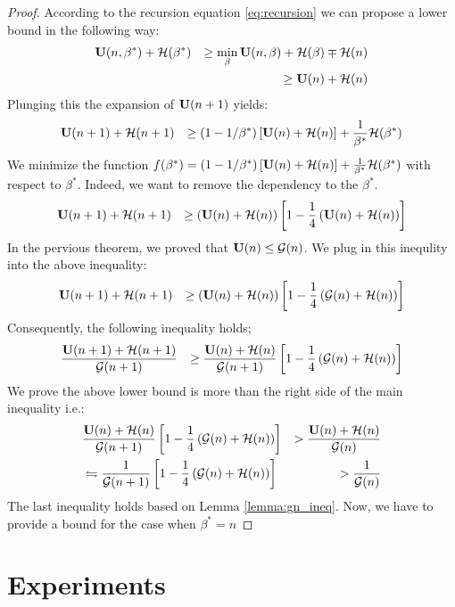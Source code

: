 \documentclass{article}
\begin{document}
\begin{proof}
According to the recursion equation \ref{eq:recursion} we can propose a lower
bound in the following way: 
\begin{eqnarray*}
	 & \mathbf U(n,\beta^*) + {\cal H}(\beta^*) & \geq \min_{\beta}
	 \mathbf U(n,\beta) + {\cal H}(\beta) \mp {\cal H}(n) \\ 
	 & & \geq \mathbf U(n) + {\cal H}(n)
\end{eqnarray*}
Plunging this the expansion of $\mathbf U(n+1)$ yields: 
\begin{eqnarray*}
	& \mathbf U(n+1) + {\cal H}(n+1) & \geq (1-1/\beta^*)\left[ \mathbf U(n) + {\cal H}(n)\right] +
	\frac{1}{\beta^*} {\cal H}(\beta^*) 
\end{eqnarray*}
We minimize the function $f(\beta^*) =  (1-1/\beta^*)\left[ \mathbf U(n) +
{\cal H}(n)\right] + \frac{1}{\beta^*} {\cal H}(\beta^*) $
with respect to $\beta^*$. Indeed, we want to remove the dependency to the
$\beta^*$.
\begin{eqnarray*}
	& \mathbf U(n+1) + {\cal H}(n+1) & \geq \left( \mathbf U(n) + {\cal H}(n)\right) \left[1 -
	\frac{1	}{4} \left( \mathbf U(n) + {\cal H}(n)\right)  \right]
\end{eqnarray*}
In the pervious theorem, we proved that $\mathbf U(n) \leq {\cal G}(n)$. We plug in
this inequlity into the above inequality: 
\begin{eqnarray*}
	& \mathbf U(n+1) + {\cal H}(n+1) & \geq \left( \mathbf U(n) + {\cal H}(n)\right) \left[1 -
	\frac{1	}{4} \left( {\cal G}(n) + {\cal H}(n)\right)  \right]
\end{eqnarray*}
Consequently, the following inequality holds; 
\begin{eqnarray*}
	& \frac{\mathbf U(n+1) + {\cal H}(n+1)}{{\cal G}(n+1)} & \geq \frac{ \mathbf U(n) +
	{\cal H}(n)}{{\cal G}(n+1)}
	\left[1 - \frac{1	}{4} \left( {\cal G}(n) + {\cal H}(n)\right)  \right]
\end{eqnarray*}
We prove the above lower bound is more than the right side of the main
inequality i.e.: 
\begin{eqnarray*}
	& \frac{ \mathbf U(n) +
	{\cal H}(n)}{{\cal G}(n+1)}
	\left[1 - \frac{1	}{4} \left( {\cal G}(n) + {\cal H}(n)\right)  \right] & >
	\frac{\mathbf U(n)+{\cal H}(n)}{{\cal G}(n)} \\ 
	& \leftrightharpoons \frac{1}{{\cal G}(n+1)}
	\left[1 - \frac{1	}{4} \left( {\cal G}(n) + {\cal H}(n)\right)  \right] & >
	\frac{1}{{\cal G}(n)}
\end{eqnarray*}
The last inequality holds based on Lemma \ref{lemma:gn_ineq}. 
Now, we have to provide a bound for the case when $\beta^* = n$
\end{proof}
\section{Experiments}
\end{document}
